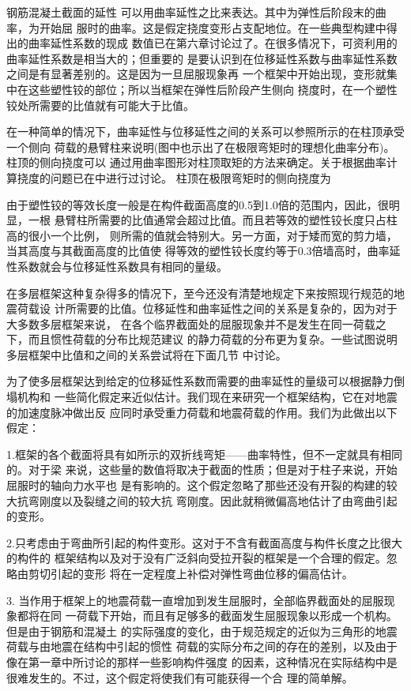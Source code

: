 \documentclass[12pt,a4paper]{book}
\begin{document}
钢筋混凝土截面的延性 可以用曲率延性之比来表达。其中为弹性后阶段末的曲率，为开始屈
服时的曲率。这是假定挠度变形占支配地位。在一些典型构建中得出的曲率延性系数的现成
数值已在第六章讨论过了。在很多情况下，可资利用的曲率延性系数是相当大的；但重要的
是要认识到在位移延性系数与曲率延性系数之间是有显著差别的。这是因为一旦屈服现象再
一个框架中开始出现，变形就集中在这些塑性铰的部位；所以当框架在弹性后阶段产生侧向
挠度时，在一个塑性铰处所需要的比值就有可能大于比值。

在一种简单的情况下，曲率延性与位移延性之间的关系可以参照所示的在柱顶承受一个侧向
荷载的悬臂柱来说明(图中也示出了在极限弯矩时的理想化曲率分布)。柱顶的侧向挠度可以
通过用曲率图形对柱顶取矩的方法来确定。关于根据曲率计算挠度的问题已在中进行过讨论。
柱顶在极限弯矩时的侧向挠度为

由于塑性铰的等效长度一般是在构件截面高度的0.5到1.0倍的范围内，因此，很明显，一根
悬臂柱所需要的比值通常会超过比值。而且若等效的塑性铰长度只占柱高的很小一个比例，
则所需的值就会特别大。另一方面，对于矮而宽的剪力墙，当其高度与其截面高度的比值使
得等效的塑性铰长度约等于0.3倍墙高时，曲率延性系数就会与位移延性系数具有相同的量级。

在多层框架这种复杂得多的情况下，至今还没有清楚地规定下来按照现行规范的地震荷载设
计所需要的比值。位移延性和曲率延性之间的关系是复杂的，因为对于大多数多层框架来说，
在各个临界截面处的屈服现象并不是发生在同一荷载之下，而且惯性荷载的分布比规范建议
的静力荷载的分布更为复杂。一些试图说明多层框架中比值和之间的关系尝试将在下面几节
中讨论。


为了使多层框架达到给定的位移延性系数而需要的曲率延性的量级可以根据静力倒塌机构和
一些简化假定来近似估计。我们现在来研究一个框架结构，它在对地震的加速度脉冲做出反
应同时承受重力荷载和地震荷载的作用。我们为此做出以下假定：

1.框架的各个截面将具有如所示的双折线弯矩——曲率特性，但不一定就具有相同的。对于梁
来说，这些量的数值将取决于截面的性质；但是对于柱子来说，开始屈服时的轴向力水平也
是有影响的。这个假定忽略了那些还没有开裂的构建的较大抗弯刚度以及裂缝之间的较大抗
弯刚度。因此就稍微偏高地估计了由弯曲引起的变形。

2.只考虑由于弯曲所引起的构件变形。这对于不含有截面高度与构件长度之比很大的构件的
框架结构以及对于没有广泛斜向受拉开裂的框架是一个合理的假定。忽略由剪切引起的变形
将在一定程度上补偿对弹性弯曲位移的偏高估计。

3. 当作用于框架上的地震荷载一直增加到发生屈服时，全部临界截面处的屈服现象都将在同
一荷载下开始，而且有足够多的截面发生屈服现象以形成一个机构。但是由于钢筋和混凝土
的实际强度的变化，由于规范规定的近似为三角形的地震荷载与由地震在结构中引起的惯性
荷载的实际分布之间的存在的差别，以及由于像在第一章中所讨论的那样一些影响构件强度
的因素，这种情况在实际结构中是很难发生的。不过，这个假定将使我们有可能获得一个合
理的简单解。
\end{document}
